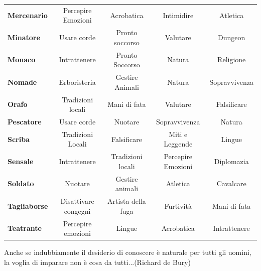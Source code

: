 \begin{tabularx}{\textwidth}{>{\raggedright\arraybackslash}l|c|c|c|c}
\textbf{Mercenario} & Percepire Emozioni & Acrobatica & Intimidire & Atletica\\
\textbf{Minatore}& Usare corde&Pronto soccorso&Valutare&Dungeon\\
\textbf{Monaco} & Intrattenere &Pronto Soccorso & Natura & Religione\\
\textbf{Nomade}&  Erboristeria& Gestire Animali & Natura &  Sopravvivenza\\
\textbf{Orafo} & Tradizioni locali & Mani di fata & Valutare & Falsificare\\
\textbf{Pescatore}& Usare corde&Nuotare&Sopravvivenza&Natura\\
\textbf{Scriba} &Tradizioni Locali& Falsificare & Miti e Leggende & Lingue\\
\textbf{Sensale} & Intrattenere & Tradizioni locali & Percepire Emozioni & Diplomazia\\
\textbf{Soldato}& Nuotare&Gestire animali&Atletica&Cavalcare\\
\textbf{Tagliaborse} & Disattivare congegni&Artista della fuga&Furtività&Mani di fata\\
\textbf{Teatrante}& Percepire emozioni& Lingue&Acrobatica&Intrattenere\\
\end{tabularx}

\vfill

\begin{enfasi}{
Anche se indubbiamente il desiderio di conoscere è naturale per tutti gli uomini, la voglia di imparare non è cosa da tutti...(Richard de Bury)
}\end{enfasi}

